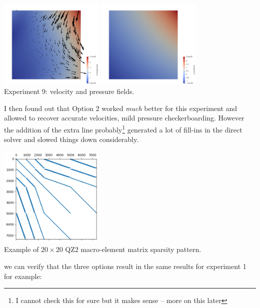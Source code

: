 \begin{center}
\includegraphics[width=5cm]{python_codes/fieldstone_78/results/exp09/vel.png}
\includegraphics[width=5cm]{python_codes/fieldstone_78/results/exp09/press.png}\\
{\captionfont Experiment 9: velocity and pressure fields.}
\end{center}

I then found out that Option 2 worked {\it much} better for this experiment
and allowed to recover accurate velocities, mild pressure checkerboarding.
However the addition of the extra line probably\footnote{I cannot check this 
for sure but it makes sense -- more on this later} generated a lot of fill-ins in the direct solver
and slowed things down considerably.

\begin{center}
\includegraphics[width=5cm]{python_codes/fieldstone_78/images/lagrange/A_bef.png}\\
{\captionfont Example of $20\times 20$ QZ2 macro-element matrix sparsity pattern.}
\end{center}

we can verify that the three options result in the same results 
for experiment 1 for example:

